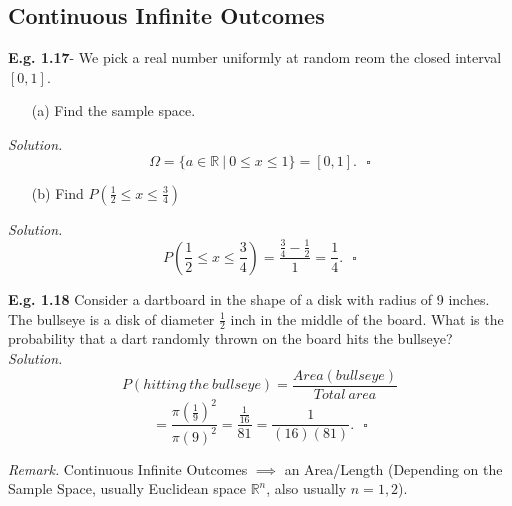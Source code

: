 \documentclass[12pt]{book}
\begin{document}
\subsection{Continuous Infinite Outcomes}
\noindent \textbf{E.g. 1.17}- We pick a real number uniformly at random reom the closed interval $[0,1]$.\\
\begin{itemize} \item[(a)] Find the sample space. \end{itemize}
\textit{Solution.}
$$\Omega = \{a\in \mathbb{R} ~|~ 0\leq x \leq 1\} = [0,1].~~~\square$$
\begin{itemize} \item[(b)] Find $P\left(\frac{1}{2} \leq x \leq \frac{3}{4}\right)$\end{itemize}
\textit{Solution.}
$$P\left(\frac{1}{2} \leq x \leq \frac{3}{4}\right) = \frac{\frac{3}{4} - \frac{1}{2}}{1} = \frac{1}{4}.~~~\square$$

\noindent \textbf{E.g. 1.18} Consider a dartboard in the shape of a disk with radius of 9 inches. The bullseye is a disk of diameter $\frac{1}{2}$ inch in the middle of the board. What is the probability that a dart randomly thrown on the board hits the bullseye?\\
\textit{Solution.}
$$P(hitting~the~bullseye) = \frac{Area(bullseye)}{Total~area}$$
$$ = \frac{\pi \left( \frac{1}{9} \right)^2}{\pi (9)^2} = \frac{\frac{1}{16}}{81} = \frac{1}{(16)(81)}.~~~\square$$

\noindent \textit{Remark.} Continuous Infinite Outcomes $\implies{}$ an Area/Length (Depending on the Sample Space, usually Euclidean space $\mathbb{R}^n$, also usually $n=1,2$).




\end{document}
